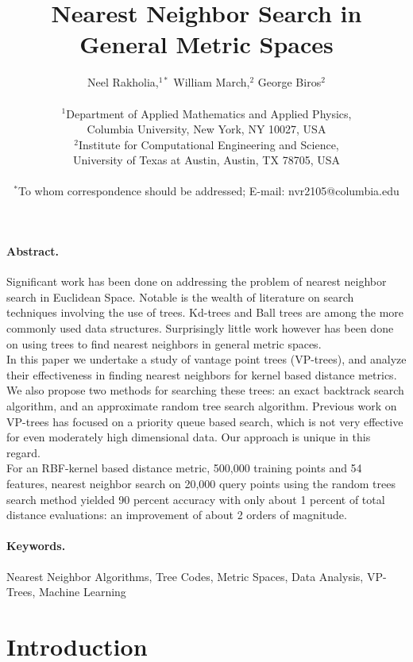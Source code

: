 \documentclass[11pt]{article}
\title{Nearest Neighbor Search in General Metric Spaces}
\author
{Neel Rakholia,$^{1\ast}$ William March,$^{2}$ George Biros$^{2}$\\
\\
\normalsize{$^{1}$Department of Applied Mathematics and Applied Physics,}\\
\normalsize{Columbia University,}
\normalsize{New York, NY 10027, USA}\\
\normalsize{$^{2}$Institute for Computational Engineering and Science,}\\
\normalsize{University of Texas at Austin,}
\normalsize{Austin, TX 78705, USA}\\
\\
\normalsize{$^\ast$To whom correspondence should be addressed; E-mail:  nvr2105@columbia.edu}
}
\date{}
\begin{document}
\maketitle 

\paragraph{Abstract.} Significant work has been done on addressing the problem of nearest neighbor search in Euclidean Space. Notable is the wealth of literature on search techniques involving the use of trees. Kd-trees and Ball trees are among the more commonly used data structures. Surprisingly little work however has been done on using trees to find nearest neighbors in general metric spaces.
\\
\indent In this paper we undertake a study of vantage point trees (VP-trees), and analyze their effectiveness in finding nearest neighbors for kernel based distance metrics. We also propose two methods for searching these trees: an exact backtrack search algorithm, and an approximate random tree search algorithm. Previous work on VP-trees has focused on a priority queue based search, which is not very effective for even moderately high dimensional data. Our approach is unique in this regard.
\\
\indent For an RBF-kernel based distance metric, 500,000 training points and 54 features, nearest neighbor search on 20,000 query points using the random trees search method yielded 90 percent accuracy with only about 1 percent of total distance evaluations: an improvement of about 2 orders of magnitude. 

\paragraph{Keywords.} Nearest Neighbor Algorithms, Tree Codes, Metric Spaces, Data Analysis, VP-Trees, Machine Learning

\section{Introduction} 
\end{document}
